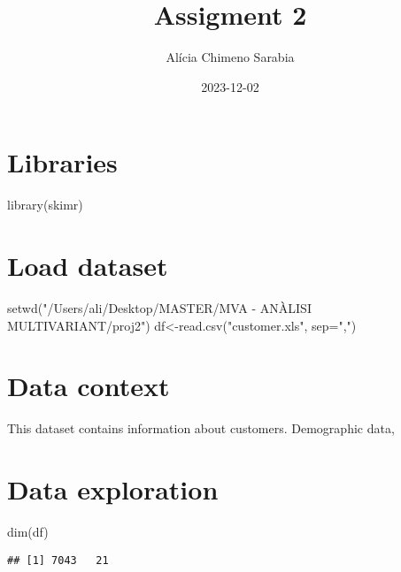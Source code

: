 \documentclass[
]{article}
\title{Assigment 2}
\author{Alícia Chimeno Sarabia}
\date{2023-12-02}
\newenvironment{Shaded}{\begin{snugshade}}{\end{snugshade}}
\newcommand{\AttributeTok}[1]{\textcolor[rgb]{0.77,0.63,0.00}{#1}}
\newcommand{\FunctionTok}[1]{\textcolor[rgb]{0.00,0.00,0.00}{#1}}
\newcommand{\NormalTok}[1]{#1}
\newcommand{\OtherTok}[1]{\textcolor[rgb]{0.56,0.35,0.01}{#1}}
\newcommand{\StringTok}[1]{\textcolor[rgb]{0.31,0.60,0.02}{#1}}
\begin{document}
\maketitle

\hypertarget{libraries}{%
\section{Libraries}\label{libraries}}

\begin{Shaded}
\begin{Highlighting}[]
\FunctionTok{library}\NormalTok{(skimr)}
\end{Highlighting}
\end{Shaded}

\hypertarget{load-dataset}{%
\section{Load dataset}\label{load-dataset}}

\begin{Shaded}
\begin{Highlighting}[]
\FunctionTok{setwd}\NormalTok{(}\StringTok{"/Users/ali/Desktop/MASTER/MVA {-} ANÀLISI MULTIVARIANT/proj2"}\NormalTok{)}
\NormalTok{df}\OtherTok{\textless{}{-}}\FunctionTok{read.csv}\NormalTok{(}\StringTok{"customer.xls"}\NormalTok{, }\AttributeTok{sep=}\StringTok{","}\NormalTok{)}
\end{Highlighting}
\end{Shaded}

\hypertarget{data-context}{%
\section{Data context}\label{data-context}}

This dataset contains information about customers. Demographic data,

\hypertarget{data-exploration}{%
\section{Data exploration}\label{data-exploration}}

\begin{Shaded}
\begin{Highlighting}[]
\FunctionTok{dim}\NormalTok{(df)}
\end{Highlighting}
\end{Shaded}

\begin{verbatim}
## [1] 7043   21
\end{verbatim}
\end{document}
